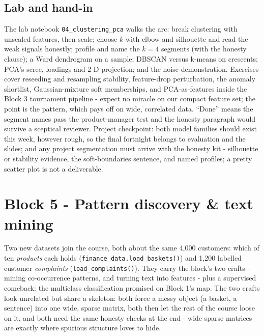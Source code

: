 \documentclass[11pt,a4paper]{article}
\begin{document}
\subsection{Lab and hand-in}
The lab notebook \texttt{04\_clustering\_pca} walks the arc: break
clustering with unscaled features, then scale; choose $k$ with elbow and
silhouette and read the weak signals honestly; profile and name the
$k=4$ segments (with the honesty clause); a Ward dendrogram on a sample;
DBSCAN versus k-means on crescents; PCA's scree, loadings and 2-D
projection; and the noise demonstration. Exercises cover reseeding and
resampling stability, feature-drop perturbation, the anomaly shortlist,
Gaussian-mixture soft memberships, and PCA-as-features inside the Block 3
tournament pipeline - expect no miracle on our compact feature set;
the point is the pattern, which pays off on wide, correlated data. ``Done''
means the segment names pass the product-manager test and the honesty
paragraph would survive a sceptical reviewer. Project checkpoint: both
model families should exist this week, however rough, so the final
fortnight belongs to evaluation and the slides; and any project
segmentation must arrive with the honesty kit - silhouette or
stability evidence, the soft-boundaries sentence, and named profiles; a
pretty scatter plot is not a deliverable.

\section{Block 5 - Pattern discovery \& text mining}

Two new datasets join the course, both about the same 4{,}000 customers:
which of ten \emph{products} each holds
(\texttt{finance\_data.load\_baskets()}) and 1{,}200 labelled customer
\emph{complaints} (\texttt{load\_complaints()}). They carry the block's two
crafts - mining co-occurrence patterns, and turning text into features
- plus a supervised comeback: the multiclass classification promised on
Block 1's map. The two crafts look unrelated but share a skeleton: both
force a messy object (a basket, a sentence) into one wide, sparse
matrix, both then let the rest of the course loose on it, and both need
the same honesty checks at the end - wide sparse matrices are exactly
where spurious structure loves to hide.
\end{document}
